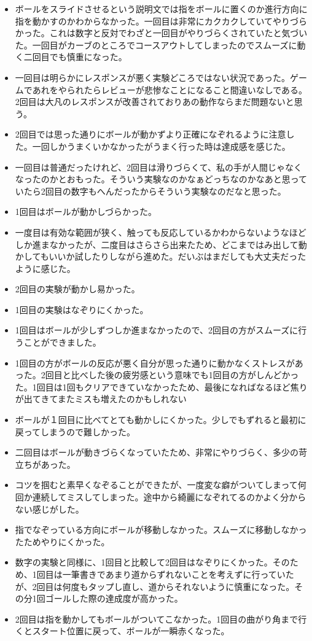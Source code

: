 \begin{itemize}
  \item ボールをスライドさせるという説明文では指をボールに置くのか進行方向に指を動かすのかわからなかった。一回目は非常にカクカクしていてやりづらかった。これは数字と反対でわざと一回目がやりづらくされていたと気づいた。一回目がカーブのところでコースアウトしてしまったのでスムーズに動く二回目でも慎重になった。
  \item 一回目は明らかにレスポンスが悪く実験どころではない状況であった。ゲームであれをやられたらレビューが悲惨なことになること間違いなしである。2回目は大凡のレスポンスが改善されておりあの動作ならまだ問題ないと思う。
  \item 2回目では思った通りにボールが動かずより正確になぞれるように注意した。一回しかうまくいかなかったがうまく行った時は達成感を感じた。
  \item 一回目は普通だったけれど、2回目は滑りづらくて、私の手が人間じゃなくなったのかとおもった。そういう実験なのかなぁどっちなのかなあと思っていたら2回目の数字もへんだったからそういう実験なのだなと思った。
  \item 1回目はボールが動かしづらかった。
  \item 一度目は有効な範囲が狭く、触っても反応しているかわからないようなほどしか進まなかったが、二度目はさらさら出来たため、どこまではみ出して動かしてもいいか試したりしながら進めた。だいぶはまだしても大丈夫だったように感じた。
  \item 2回目の実験が動かし易かった。
  \item 1回目の実験はなぞりにくかった。
  \item 1回目はボールが少しずつしか進まなかったので、2回目の方がスムーズに行うことができました。
  \item 1回目の方がボールの反応が悪く自分が思った通りに動かなくストレスがあった。2回目と比べした後の疲労感という意味でも1回目の方がしんどかった。1回目は1回もクリアできていなかったため、最後になればなるほど焦りが出てきてまたミスも増えたのかもしれない
  \item ボールが１回目に比べてとても動かしにくかった。少しでもずれると最初に戻ってしまうので難しかった。
  \item 二回目はボールが動きづらくなっていたため、非常にやりづらく、多少の苛立ちがあった。
  \item コツを掴むと素早くなぞることができたが、一度変な癖がついてしまって何回か連続してミスしてしまった。途中から綺麗になぞれてるのかよく分からない感じがした。
  \item 指でなぞっている方向にボールが移動しなかった。スムーズに移動しなかったためやりにくかった。
  \item 数字の実験と同様に、1回目と比較して2回目はなぞりにくかった。そのため、1回目は一筆書きであまり道からずれないことを考えずに行っていたが、2回目は何度もタップし直し、道からそれないように慎重になった。その分1回ゴールした際の達成度が高かった。
  \item 2回目は指を動かしてもボールがついてこなかった。1回目の曲がり角まで行くとスタート位置に戻って、ボールが一瞬赤くなった。
\end{itemize}
